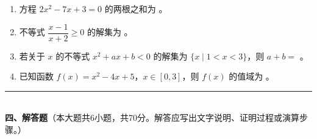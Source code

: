 \documentclass[12pt, a4paper]{ctexart}
\begin{document}
\vspace{6pt}

\begin{enumerate}[resume]
\item 方程 $2x^2-7x+3=0$ 的两根之和为 \underline{\hspace{3cm}}。

\item 不等式 $\dfrac{x-1}{x+2}\geq 0$ 的解集为 \underline{\hspace{4cm}}。

\item 若关于 $x$ 的不等式 $x^2+ax+b<0$ 的解集为 $\{x\mid 1<x<3\}$，则 $a+b=$ \underline{\hspace{2cm}}。

\item 已知函数 $f(x)=x^2-4x+5$，$x\in[0,3]$，则 $f(x)$ 的值域为 \underline{\hspace{4cm}}。
\end{enumerate}

\vspace{6pt}

\noindent\rule{\textwidth}{0.4pt}\\[2pt]
{\large\bfseries 四、解答题}（本大题共6小题，共70分。解答应写出文字说明、证明过程或演算步骤。）

\vspace{6pt}
\end{document}
